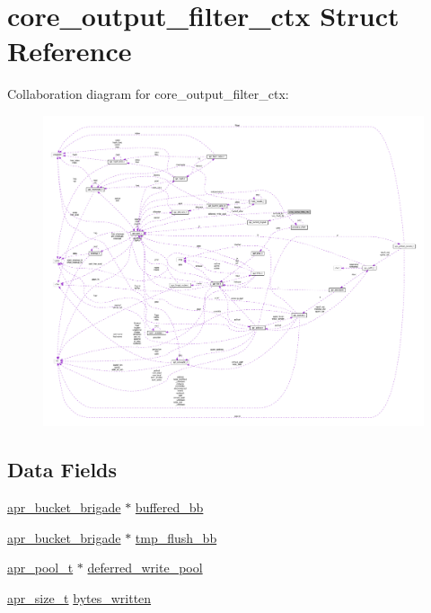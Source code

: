 \hypertarget{structcore__output__filter__ctx}{}\section{core\+\_\+output\+\_\+filter\+\_\+ctx Struct Reference}
\label{structcore__output__filter__ctx}


Collaboration diagram for core\+\_\+output\+\_\+filter\+\_\+ctx\+:
\nopagebreak
\begin{figure}[H]
\begin{center}
\leavevmode
\includegraphics[width=350pt]{structcore__output__filter__ctx__coll__graph}
\end{center}
\end{figure}
\subsection*{Data Fields}
\begin{DoxyCompactItemize}
\item 
\hyperlink{structapr__bucket__brigade}{apr\+\_\+bucket\+\_\+brigade} $\ast$ \hyperlink{structcore__output__filter__ctx_a04cf905413fb49ea1aa66f928a224bfe}{buffered\+\_\+bb}
\item 
\hyperlink{structapr__bucket__brigade}{apr\+\_\+bucket\+\_\+brigade} $\ast$ \hyperlink{structcore__output__filter__ctx_a4ace06e703ead7dd323d06811b1b5dc9}{tmp\+\_\+flush\+\_\+bb}
\item 
\hyperlink{structapr__pool__t}{apr\+\_\+pool\+\_\+t} $\ast$ \hyperlink{structcore__output__filter__ctx_adc44bf0980f83bb2b6601fb858f39707}{deferred\+\_\+write\+\_\+pool}
\item 
\hyperlink{group__apr__platform_gaaa72b2253f6f3032cefea5712a27540e}{apr\+\_\+size\+\_\+t} \hyperlink{structcore__output__filter__ctx_a2c23def8a39ea275c8a614ff9c086189}{bytes\+\_\+written}
\end{DoxyCompactItemize}


